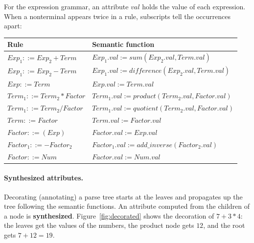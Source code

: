 For the expression grammar, an attribute $\mathit{val}$ holds the value of each
expression. When a nonterminal appears twice in a rule, subscripts tell the
occurrences apart:
\begin{center}
\small
\begin{tabular}{l l}
  \toprule
  Rule & Semantic function \\
  \midrule
  $\mathit{Exp}_1 ::= \mathit{Exp}_2 + \mathit{Term}$ & $\mathit{Exp}_1.\mathit{val} := \mathit{sum}(\mathit{Exp}_2.\mathit{val}, \mathit{Term}.\mathit{val})$ \\
  $\mathit{Exp}_1 ::= \mathit{Exp}_2 - \mathit{Term}$ & $\mathit{Exp}_1.\mathit{val} := \mathit{difference}(\mathit{Exp}_2.\mathit{val}, \mathit{Term}.\mathit{val})$ \\
  $\mathit{Exp} ::= \mathit{Term}$ & $\mathit{Exp}.\mathit{val} := \mathit{Term}.\mathit{val}$ \\
  $\mathit{Term}_1 ::= \mathit{Term}_2 * \mathit{Factor}$ & $\mathit{Term}_1.\mathit{val} := \mathit{product}(\mathit{Term}_2.\mathit{val}, \mathit{Factor}.\mathit{val})$ \\
  $\mathit{Term}_1 ::= \mathit{Term}_2 / \mathit{Factor}$ & $\mathit{Term}_1.\mathit{val} := \mathit{quotient}(\mathit{Term}_2.\mathit{val}, \mathit{Factor}.\mathit{val})$ \\
  $\mathit{Term} ::= \mathit{Factor}$ & $\mathit{Term}.\mathit{val} := \mathit{Factor}.\mathit{val}$ \\
  $\mathit{Factor} ::= (\mathit{Exp})$ & $\mathit{Factor}.\mathit{val} := \mathit{Exp}.\mathit{val}$ \\
  $\mathit{Factor}_1 ::= - \mathit{Factor}_2$ & $\mathit{Factor}_1.\mathit{val} := \mathit{add\_inverse}(\mathit{Factor}_2.\mathit{val})$ \\
  $\mathit{Factor} ::= \mathit{Num}$ & $\mathit{Factor}.\mathit{val} := \mathit{Num}.\mathit{val}$ \\
  \bottomrule
\end{tabular}
\end{center}

\paragraph{Synthesized attributes.} Decorating (annotating) a parse tree starts
at the leaves and propagates up the tree following the semantic functions.
An attribute computed from the children of a node is \textbf{synthesized}.
Figure~\ref{fig:decorated} shows the decoration of $7 + 3 * 4$: the leaves
get the values of the numbers, the product node gets $12$, and the root gets
$7 + 12 = 19$.

